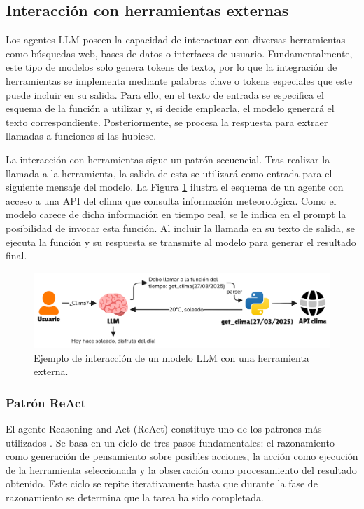 \subsection{Interacción con herramientas externas}
Los agentes LLM poseen la capacidad de interactuar con diversas herramientas como búsquedas web, bases de datos o interfaces de usuario. Fundamentalmente, este tipo de modelos solo genera tokens de texto, por lo que la integración de herramientas se implementa mediante palabras clave o tokens especiales que este puede incluir en su salida. Para ello, en el texto de entrada se especifica el esquema de la función a utilizar y, si decide emplearla, el modelo generará el texto correspondiente. Posteriormente, se procesa la respuesta para extraer llamadas a funciones si las hubiese.

La interacción con herramientas sigue un patrón secuencial. Tras realizar la llamada a la herramienta, la salida de esta se utilizará como entrada para el siguiente mensaje del modelo. La Figura \ref{fig:herramientas} ilustra el esquema de un agente con acceso a una API del clima que consulta información meteorológica. Como el modelo carece de dicha información en tiempo real, se le indica en el prompt la posibilidad de invocar esta función. Al incluir la llamada en su texto de salida, se ejecuta la función y su respuesta se transmite al modelo para generar el resultado final.

\begin{figure}[H]
  \centering
  \includegraphics[width=1.05\linewidth]{figures/herramienta.png}
  \caption{Ejemplo de interacción de un modelo LLM con una herramienta externa.}
  \label{fig:herramientas}
\end{figure}


\subsubsection{Patrón ReAct}
\label{sec:react}
El agente Reasoning and Act (ReAct) constituye uno de los patrones más utilizados \cite{yao_react_2023}. Se basa en un ciclo de tres pasos fundamentales: el razonamiento como generación de pensamiento sobre posibles acciones, la acción como ejecución de la herramienta seleccionada y la observación como procesamiento del resultado obtenido. Este ciclo se repite iterativamente hasta que durante la fase de razonamiento se determina que la tarea ha sido completada.

